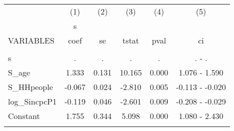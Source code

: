 \documentclass[]{article}
\begin{document}
\begin{tabular}{lccccc} \hline
 & (1) & (2) & (3) & (4) & (5) \\
 & s &  &  &  &  \\
VARIABLES & coef & se & tstat & pval & ci \\ \hline
 &  &  &  &  &  \\
s & . & . & . & . & . - . \\
S\_age & 1.333 & 0.131 & 10.165 & 0.000 & 1.076 - 1.590 \\
S\_HHpeople & -0.067 & 0.024 & -2.810 & 0.005 & -0.113 - -0.020 \\
log\_SincpcP1 & -0.119 & 0.046 & -2.601 & 0.009 & -0.208 - -0.029 \\
Constant & 1.755 & 0.344 & 5.098 & 0.000 & 1.080 - 2.430 \\
 &  &  &  &  &  \\ \hline
\end{tabular}
\end{document}

